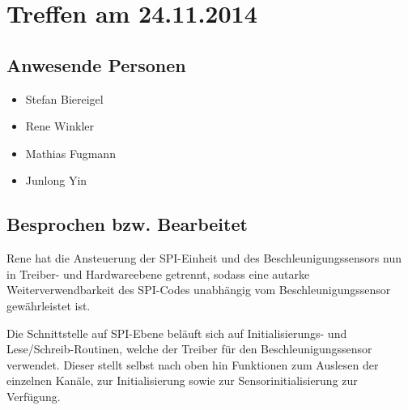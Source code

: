 \chapter{Treffen am 24.11.2014}
\section{Anwesende Personen}
\begin{itemize}
	\item Stefan Biereigel
	\item Rene Winkler
	\item Mathias Fugmann
	\item Junlong Yin
\end{itemize}

\section{Besprochen bzw. Bearbeitet}
Rene hat die Ansteuerung der SPI-Einheit und des Beschleunigungssensors nun in Treiber- und Hardwareebene getrennt, sodass eine autarke Weiterverwendbarkeit des SPI-Codes unabhängig vom Beschleunigungssensor gewährleistet ist.

Die Schnittstelle auf SPI-Ebene beläuft sich auf Initialisierungs- und Lese/Schreib-Routinen, welche der Treiber für den Beschleunigungssensor verwendet. Dieser stellt selbst nach oben hin Funktionen zum Auslesen der einzelnen Kanäle, zur Initialisierung sowie zur Sensorinitialisierung zur Verfügung.
